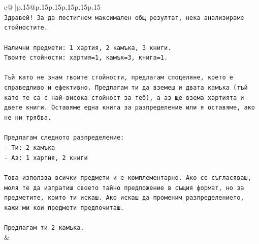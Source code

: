 \documentclass{article}
\begin{document}
{\begin{supertabular}{c@{$\;$}|p{.15\linewidth}@{}p{.15\linewidth}p{.15\linewidth}p{.15\linewidth}p{.15\linewidth}p{.15\linewidth}}
{{{\\ 
\texttt{Здравей! За да постигнем максимален общ резултат, нека анализираме стойностите.} \\
\\ 
\texttt{Налични предмети: 1 хартия, 2 камъка, 3 книги.} \\
\texttt{Твоите стойности: хартия=1, камък=3, книга=1.} \\
\\ 
\texttt{Тъй като не знам твоите стойности, предлагам споделяне, което е справедливо и ефективно. Предлагам ти да вземеш и двата камъка (тъй като те са с най{-}висока стойност за теб), а аз ще взема хартията и двете книги. Оставяме една книга за разпределение или я оставяме, ако не ни трябва.} \\
\\ 
\texttt{Предлагам следното разпределение:} \\
\texttt{{-} Ти: 2 камъка} \\
\texttt{{-} Аз: 1 хартия, 2 книги} \\
\\ 
\texttt{Това използва всички предмети и е комплементарно. Ако се съгласяваш, моля те да изпратиш своето тайно предложение в същия формат, но за предметите, които ти искаш. Ако искаш да променим разпределението, кажи ми кои предмети предпочиташ.} \\
\\ 
\texttt{Предлагам ти 2 камъка.} \\
            }
        }
    }
    & \\ \\


\end{supertabular}}
\end{document}
